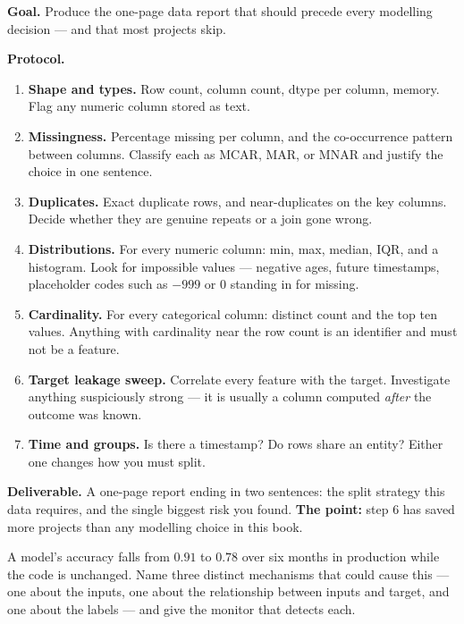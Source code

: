 \begin{practicallab}
\textbf{Goal.} Produce the one-page data report that should precede every
modelling decision --- and that most projects skip.

\textbf{Protocol.}
\begin{enumerate}
  \item \textbf{Shape and types.} Row count, column count, dtype per column,
        memory. Flag any numeric column stored as text.
  \item \textbf{Missingness.} Percentage missing per column, and the
        co-occurrence pattern between columns. Classify each as MCAR, MAR, or
        MNAR and justify the choice in one sentence.
  \item \textbf{Duplicates.} Exact duplicate rows, and near-duplicates on the
        key columns. Decide whether they are genuine repeats or a join gone
        wrong.
  \item \textbf{Distributions.} For every numeric column: min, max, median,
        IQR, and a histogram. Look for impossible values --- negative ages,
        future timestamps, placeholder codes such as $-999$ or $0$ standing in
        for missing.
  \item \textbf{Cardinality.} For every categorical column: distinct count and
        the top ten values. Anything with cardinality near the row count is an
        identifier and must not be a feature.
  \item \textbf{Target leakage sweep.} Correlate every feature with the target.
        Investigate anything suspiciously strong --- it is usually a column
        computed \emph{after} the outcome was known.
  \item \textbf{Time and groups.} Is there a timestamp? Do rows share an entity?
        Either one changes how you must split.
\end{enumerate}

\textbf{Deliverable.} A one-page report ending in two sentences: the split
strategy this data requires, and the single biggest risk you found.
\textbf{The point:} step 6 has saved more projects than any modelling choice in
this book.
\end{practicallab}

\begin{checkpoint}
A model's accuracy falls from $0.91$ to $0.78$ over six months in production
while the code is unchanged. Name three distinct mechanisms that could cause
this --- one about the inputs, one about the relationship between inputs and
target, and one about the labels --- and give the monitor that detects each.
\end{checkpoint}


